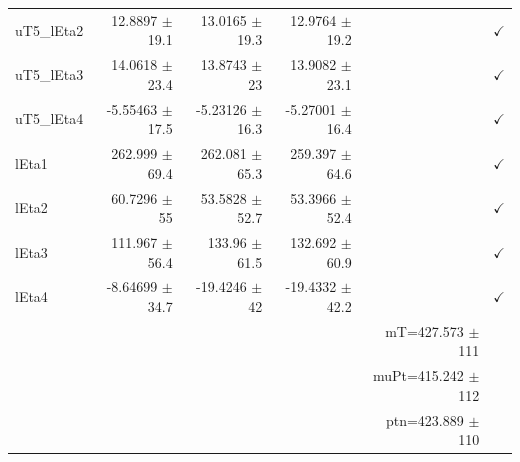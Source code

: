 \begin{table}[htbp]
\begin{tabular}{lrrrrr}
uT5\_lEta2 & 12.8897 $\pm$ 19.1 & 13.0165 $\pm$ 19.3 & 12.9764 $\pm$ 19.2 &  & $\checkmark$ \\
uT5\_lEta3 & 14.0618 $\pm$ 23.4 & 13.8743 $\pm$ 23 & 13.9082 $\pm$ 23.1 &  & $\checkmark$ \\
uT5\_lEta4 & -5.55463 $\pm$ 17.5 & -5.23126 $\pm$ 16.3 & -5.27001 $\pm$ 16.4 &  & $\checkmark$ \\
\hline
lEta1 & 262.999 $\pm$ 69.4 & 262.081 $\pm$ 65.3 & 259.397 $\pm$ 64.6 &  & $\checkmark$ \\
lEta2 & 60.7296 $\pm$ 55 & 53.5828 $\pm$ 52.7 & 53.3966 $\pm$ 52.4 &  & $\checkmark$ \\
lEta3 & 111.967 $\pm$ 56.4 & 133.96 $\pm$ 61.5 & 132.692 $\pm$ 60.9 &  & $\checkmark$ \\
lEta4 & -8.64699 $\pm$ 34.7 & -19.4246 $\pm$ 42 & -19.4332 $\pm$ 42.2 &  & $\checkmark$ \\
\hline
 &  &  &  & mT=427.573 $\pm$ 111 &  \\
 &  &  &  & muPt=415.242 $\pm$ 112 &  \\
 &  &  &  & ptn=423.889 $\pm$ 110 &  \\
\hline
\end{tabular}
\end{table}